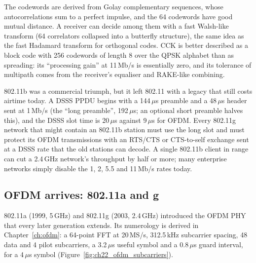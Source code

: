The codewords are derived from Golay complementary sequences, whose autocorrelations sum to a
perfect impulse, and the 64 codewords have good mutual distance. A receiver can decide among them
with a fast Walsh-like transform (64 correlators collapsed into a butterfly structure), the same
idea as the fast Hadamard transform for orthogonal codes. CCK is better described as a block code
with 256 codewords of length 8 over the QPSK alphabet than as spreading: its ``processing gain'' at
11\,Mb/s is essentially zero, and its tolerance of multipath comes from the receiver's equaliser and
RAKE-like combining.

\begin{pitfall}
802.11b was a commercial triumph, but it left 802.11 with a legacy that still costs airtime today.
A DSSS PPDU begins with a 144\,$\mu$s preamble and a 48\,$\mu$s header sent at 1\,Mb/s (the ``long
preamble'', 192\,$\mu$s; an optional short preamble halves this), and the DSSS slot time is
20\,$\mu$s against 9\,$\mu$s for OFDM. Every 802.11g network that might contain an 802.11b station
must use the long slot and must protect its OFDM transmissions with an RTS/CTS or CTS-to-self
exchange sent at a DSSS rate that the old stations can decode. A single 802.11b client in range can
cut a 2.4\,GHz network's throughput by half or more; many enterprise networks simply disable the 1,
2, 5.5 and 11\,Mb/s rates today.
\end{pitfall}

\subsection{OFDM arrives: 802.11a and g}

802.11a (1999, 5\,GHz) and 802.11g (2003, 2.4\,GHz) introduced the OFDM PHY that every later
generation extends. Its numerology is derived in Chapter~\ref{ch:ofdm}: a 64-point FFT at 20\,MS/s,
312.5\,kHz subcarrier spacing, 48 data and 4 pilot subcarriers, a 3.2\,$\mu$s useful symbol and a
0.8\,$\mu$s guard interval, for a 4\,$\mu$s symbol (Figure~\ref{fig:ch22_ofdm_subcarriers}).


